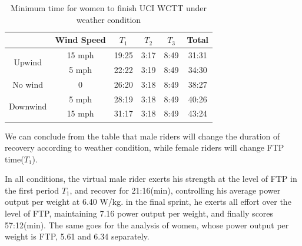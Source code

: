 \begin{table}[h]
	\setlength\tabcolsep{13pt}%
	\setlength{\belowcaptionskip}{0.2cm}
	\centering
	\caption{Minimum time for women to finish UCI WCTT under weather condition}
	\begin{tabular}{c|ccccc}
		\toprule[2pt]
		& Wind Speed & $T_1$  & $T_2$  & $T_3$  & Total \\
		\midrule
		\multirow{2}[2]{*}{Upwind} & 15 mph    & 19:25 & 3:17  & 8:49  & 31:31 \\
		& 5 mph    & 22:22 & 3:19  & 8:49  & 34:30 \\
		\midrule
		No wind & 0     & 26:20 & 3:18  & 8:49  & 38:27 \\
		\midrule
		\multirow{2}[2]{*}{Downwind} & 5 mph     & 28:19 & 3:18  & 8:49  & 40:26 \\
		& 15 mph     & 31:17 & 3:18  & 8:49  & 43:24 \\
		\bottomrule[2pt]
	\end{tabular}%
	\label{wind2}%
\end{table}%
\par We can conclude from the table that male riders will change the duration of recovery according to weather condition, while female riders will change FTP time($T_1$).
\par In all conditions, the virtual male rider exerts his strength at the level of FTP in the first period  $T_1$, and recover for 21:16(min), controlling his average power output per weight at 6.40 W/kg. in the final sprint, he exerts all effort over the level of FTP, maintaining 7.16 power output per weight, and finally scores 57:12(min). The same goes for the analysis of women, whose power output per weight is FTP, 5.61 and 6.34 separately.

